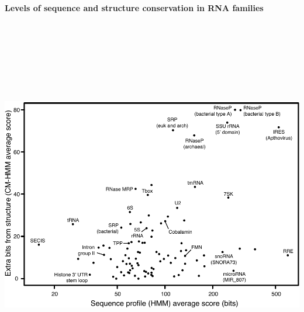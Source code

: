 \documentclass[landscape]{slides}
\begin{document}
\begin{slide}
\begin{center}
\textbf{Levels of sequence and structure conservation in RNA families}
\end{center}
\medskip

\begin{center}
\includegraphics[height=6.5in]{figs/avgscores}
\end{center}

\vfill

\end{slide}
\end{document}
